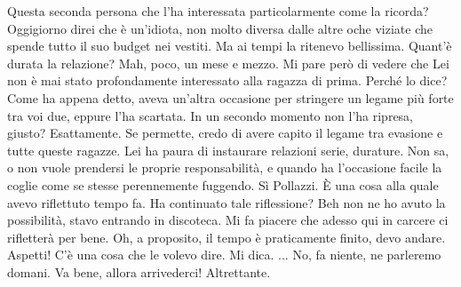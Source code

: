 \documentclass[a4paper,12pt]{article}
\newcommand{\Walter}{\speak{W}}
\newcommand{\Pollazzi}{\speak{P}}
\begin{document}
\begin{dialogue}
\Pollazzi Questa seconda persona che l'ha interessata particolarmente come la ricorda?
\Walter Oggigiorno direi che è un'idiota, non molto diversa dalle altre oche viziate che spende tutto il suo budget nei vestiti. Ma ai tempi la ritenevo bellissima.
\Pollazzi Quant'è durata la relazione?
\Walter Mah, poco, un mese e mezzo.
\Pollazzi Mi pare però di vedere che Lei non è mai stato profondamente interessato alla ragazza di prima.
\Walter Perché lo dice?
\Pollazzi Come ha appena detto, aveva un'altra occasione per stringere un legame più forte tra voi due, eppure l'ha scartata. In un secondo momento non l'ha ripresa, giusto?
\Walter Esattamente.
\Pollazzi Se permette, credo di avere capito il legame tra evasione e tutte queste ragazze. Lei ha paura di instaurare relazioni serie, durature. Non sa, o non vuole prendersi le proprie responsabilità, e quando ha l'occasione facile la coglie come se stesse perennemente fuggendo.
\Walter Sì Pollazzi. È una cosa alla quale avevo riflettuto tempo fa.
\Pollazzi Ha continuato tale riflessione?
\Walter Beh non ne ho avuto la possibilità, stavo entrando in discoteca.
\Pollazzi Mi fa piacere che adesso qui in carcere ci rifletterà per bene. Oh, a proposito, il tempo è praticamente finito, devo andare.
\Walter Aspetti! C'è una cosa che le volevo dire.
\Pollazzi Mi dica.
\Walter ... No, fa niente, ne parleremo domani.
\Pollazzi Va bene, allora arrivederci!
\Walter Altrettante.
\end{dialogue}
\end{document}
